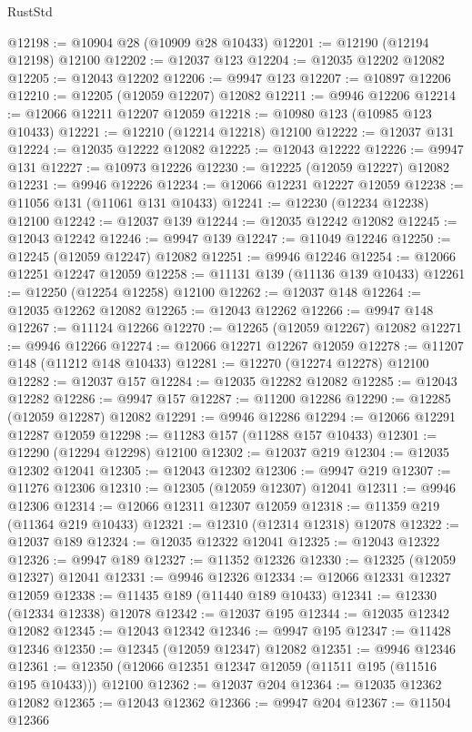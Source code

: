 \begin{lexlean}{RustStd}
\begin{coremodule}
@12198 := @10904 @28 (@10909 @28 @10433)
@12201 := @12190 (@12194 @12198) @12100
@12202 := @12037 @123
@12204 := @12035 @12202 @12082
@12205 := @12043 @12202
@12206 := @9947 @123
@12207 := @10897 @12206
@12210 := @12205 (@12059 @12207) @12082
@12211 := @9946 @12206
@12214 := @12066 @12211 @12207 @12059
@12218 := @10980 @123 (@10985 @123 @10433)
@12221 := @12210 (@12214 @12218) @12100
@12222 := @12037 @131
@12224 := @12035 @12222 @12082
@12225 := @12043 @12222
@12226 := @9947 @131
@12227 := @10973 @12226
@12230 := @12225 (@12059 @12227) @12082
@12231 := @9946 @12226
@12234 := @12066 @12231 @12227 @12059
@12238 := @11056 @131 (@11061 @131 @10433)
@12241 := @12230 (@12234 @12238) @12100
@12242 := @12037 @139
@12244 := @12035 @12242 @12082
@12245 := @12043 @12242
@12246 := @9947 @139
@12247 := @11049 @12246
@12250 := @12245 (@12059 @12247) @12082
@12251 := @9946 @12246
@12254 := @12066 @12251 @12247 @12059
@12258 := @11131 @139 (@11136 @139 @10433)
@12261 := @12250 (@12254 @12258) @12100
@12262 := @12037 @148
@12264 := @12035 @12262 @12082
@12265 := @12043 @12262
@12266 := @9947 @148
@12267 := @11124 @12266
@12270 := @12265 (@12059 @12267) @12082
@12271 := @9946 @12266
@12274 := @12066 @12271 @12267 @12059
@12278 := @11207 @148 (@11212 @148 @10433)
@12281 := @12270 (@12274 @12278) @12100
@12282 := @12037 @157
@12284 := @12035 @12282 @12082
@12285 := @12043 @12282
@12286 := @9947 @157
@12287 := @11200 @12286
@12290 := @12285 (@12059 @12287) @12082
@12291 := @9946 @12286
@12294 := @12066 @12291 @12287 @12059
@12298 := @11283 @157 (@11288 @157 @10433)
@12301 := @12290 (@12294 @12298) @12100
@12302 := @12037 @219
@12304 := @12035 @12302 @12041
@12305 := @12043 @12302
@12306 := @9947 @219
@12307 := @11276 @12306
@12310 := @12305 (@12059 @12307) @12041
@12311 := @9946 @12306
@12314 := @12066 @12311 @12307 @12059
@12318 := @11359 @219 (@11364 @219 @10433)
@12321 := @12310 (@12314 @12318) @12078
@12322 := @12037 @189
@12324 := @12035 @12322 @12041
@12325 := @12043 @12322
@12326 := @9947 @189
@12327 := @11352 @12326
@12330 := @12325 (@12059 @12327) @12041
@12331 := @9946 @12326
@12334 := @12066 @12331 @12327 @12059
@12338 := @11435 @189 (@11440 @189 @10433)
@12341 := @12330 (@12334 @12338) @12078
@12342 := @12037 @195
@12344 := @12035 @12342 @12082
@12345 := @12043 @12342
@12346 := @9947 @195
@12347 := @11428 @12346
@12350 := @12345 (@12059 @12347) @12082
@12351 := @9946 @12346
@12361 := @12350 (@12066 @12351 @12347 @12059 (@11511 @195 (@11516 @195 @10433))) @12100
@12362 := @12037 @204
@12364 := @12035 @12362 @12082
@12365 := @12043 @12362
@12366 := @9947 @204
@12367 := @11504 @12366

\end{coremodule}
\end{lexlean}
